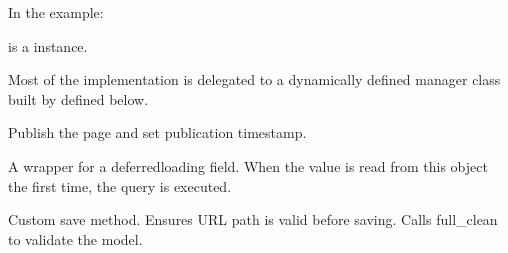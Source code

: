 \documentclass[letterpaper,10pt,english]{sphinxmanual}
\begin{document}
\begin{fulllineitems}
\begin{fulllineitems}
\sphinxAtStartPar
In the example:

\begin{sphinxVerbatim}[commandchars=\\\{\}]
 
       
\end{sphinxVerbatim}

\sphinxAtStartPar
{} is a  instance.

\sphinxAtStartPar
Most of the implementation is delegated to a dynamically defined manager
class built by  defined below.

\end{fulllineitems}


\begin{fulllineitems}
\label{\detokenize{pages_app.models:pages_app.models.page.Page.publish}}
\pysigstartsignatures
\pysiglinewithargsret
{}
{}
{}
\pysigstopsignatures
\sphinxAtStartPar
Publish the page and set publication timestamp.

\end{fulllineitems}


\begin{fulllineitems}
\label{\detokenize{pages_app.models:id17}}
\pysigstartsignatures
\pysigline
{}
\pysigstopsignatures
\sphinxAtStartPar
A wrapper for a deferred\sphinxhyphen{}loading field. When the value is read from this
object the first time, the query is executed.

\end{fulllineitems}


\begin{fulllineitems}
\label{\detokenize{pages_app.models:pages_app.models.page.Page.save}}
\pysigstartsignatures
\pysiglinewithargsret
{}
{\sphinxparamcomma {}}
{}
\pysigstopsignatures
\sphinxAtStartPar
Custom save method.
Ensures URL path is valid before saving.
Calls full\_clean to validate the model.


\end{fulllineitems}
\end{fulllineitems}
\end{document}
